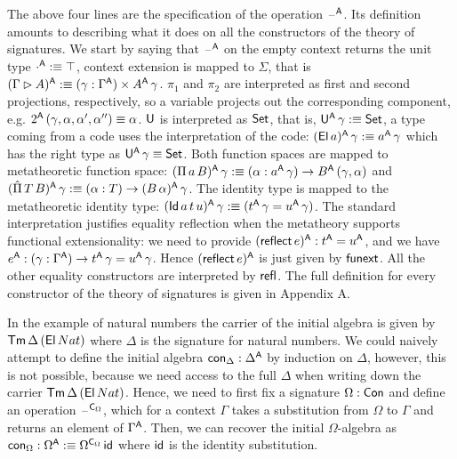 \documentclass[acmsmall,screen]{acmart}
\begin{document}
The above four lines are the specification of the operation
$\mathord{\hspace{1pt}\text{--}\hspace{1pt}}^{\mathsf{A}}$. Its definition amounts to describing what it does on all
the constructors of the theory of signatures. We start by saying that
$\mathord{\hspace{1pt}\text{--}\hspace{1pt}}^{\mathsf{A}}$ on the empty context returns the unit type $\cdot^{\mathsf{A}}
:\equiv \top$, context extension is mapped to $\Sigma$, that is
$(\Gamma\rhd A)^{\mathsf{A}}:\equiv (\gamma:\Gamma^{\mathsf{A}})\times
A^{\mathsf{A}}\,\gamma$. $\pi_1$ and $\pi_2$ are interpreted as first and second
projections, respectively, so a variable projects out the
corresponding component, e.g. $2^{\mathsf{A}}\,(\gamma,\alpha, \alpha',\alpha'')
\equiv \alpha$. $\mathsf{U}$ is interpreted as $\mathsf{Set}$, that is, $\mathsf{U}^{\mathsf{A}}\,\gamma
:\equiv \mathsf{Set}$, a type coming from a code uses the interpretation of
the code: $(\mathsf{El}\,a)^{\mathsf{A}}\,\gamma :\equiv a^{\mathsf{A}}\,\gamma$ which has the
right type as $\mathsf{U}^{\mathsf{A}}\,\gamma \equiv \mathsf{Set}$. Both function spaces are
mapped to metatheoretic function space: $(\Pi\,a\,B)^{\mathsf{A}}\,\gamma
:\equiv (\alpha:a^{\mathsf{A}}\,\gamma)\rightarrow B^{\mathsf{A}}\,(\gamma,\alpha)$ and
$(\hat{\Pi}\,T\,B)^{\mathsf{A}}\,\gamma :\equiv
(\alpha:T)\rightarrow(B\,\alpha)^{\mathsf{A}}\,\gamma$. The identity type is mapped to
the metatheoretic identity type: $(\mathsf{Id}\,a\,t\,u)^{\mathsf{A}}\,\gamma :\equiv
(t^{\mathsf{A}}\,\gamma=u^{\mathsf{A}}\,\gamma)$. The standard interpretation justifies
equality reflection when the metatheory supports functional
extensionality: we need to provide $(\mathsf{reflect}\,e)^{\mathsf{A}} : t^{\mathsf{A}} = u^{\mathsf{A}}$,
and we have $e^{\mathsf{A}}:(\gamma:\Gamma^{\mathsf{A}})\rightarrow
t^{\mathsf{A}}\,\gamma=u^{\mathsf{A}}\,\gamma$. Hence $(\mathsf{reflect}\,e)^{\mathsf{A}}$ is just given by
$\mathsf{funext}$. All the other equality constructors are interpreted by
$\mathsf{refl}$. The full definition for every constructor of the theory of
signatures is given in Appendix A.

In the example of natural numbers the carrier of the initial algebra
is given by $\mathsf{Tm}\,\Delta\,(\mathsf{El}\,Nat)$ where $\Delta$ is the signature
for natural numbers. We could naively attempt to define the initial
algebra $\mathsf{con}_\Delta:\Delta^{\mathsf{A}}$ by induction on $\Delta$, however,
this is not possible, because we need access to the full $\Delta$ when
writing down the carrier $\mathsf{Tm}\,\Delta\,(\mathsf{El}\,Nat)$. Hence, we need to
first fix a signature $\Omega:\mathsf{Con}$ and define an operation
$\mathord{\hspace{1pt}\text{--}\hspace{1pt}}^{\mathsf{C}_\Omega}$, which for a context $\Gamma$ takes a substitution
from $\Omega$ to $\Gamma$ and returns an element of $\Gamma^{\mathsf{A}}$. Then,
we can recover the initial $\Omega$-algebra as
$\mathsf{con}_\Omega:\Omega^{\mathsf{A}}:\equiv \Omega^{\mathsf{C}_{\Omega}}\,\mathsf{id}$ where $\mathsf{id}$
is the identity substitution.
\end{document}
